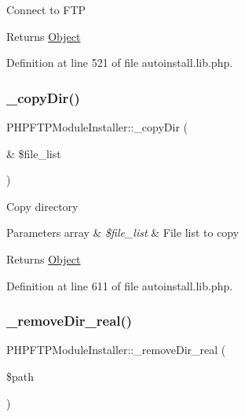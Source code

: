 Connect to F\+TP

\begin{DoxyReturn}{Returns}
\hyperlink{classObject}{Object} 
\end{DoxyReturn}


Definition at line 521 of file autoinstall.\+lib.\+php.

\mbox{\label{classPHPFTPModuleInstaller_ae9c696b9a99eea744500a23c2f30c81a}} 
\subsubsection{\texorpdfstring{\+\_\+copy\+Dir()}{\_copyDir()}}
{\footnotesize\ttfamily P\+H\+P\+F\+T\+P\+Module\+Installer\+::\+\_\+copy\+Dir (\begin{DoxyParamCaption}\item[{\&}]{\$file\+\_\+list }\end{DoxyParamCaption})}

Copy directory


\begin{DoxyParams}[1]{Parameters}
array & {\em \$file\+\_\+list} & File list to copy \\
\hline
\end{DoxyParams}
\begin{DoxyReturn}{Returns}
\hyperlink{classObject}{Object} 
\end{DoxyReturn}


Definition at line 611 of file autoinstall.\+lib.\+php.

\mbox{\label{classPHPFTPModuleInstaller_abc79bfe0eea3d10f91672313cf8763c0}} 
\subsubsection{\texorpdfstring{\+\_\+remove\+Dir\+\_\+real()}{\_removeDir\_real()}}
{\footnotesize\ttfamily P\+H\+P\+F\+T\+P\+Module\+Installer\+::\+\_\+remove\+Dir\+\_\+real (\begin{DoxyParamCaption}\item[{}]{\$path }\end{DoxyParamCaption})}

